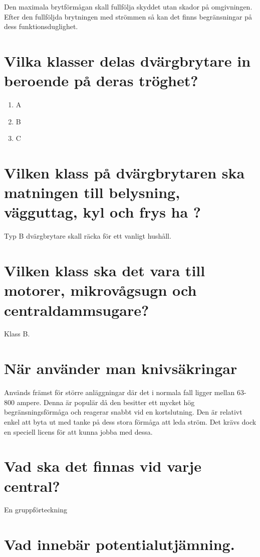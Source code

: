 \documentclass[a4paper,swedish]{article}
\begin{document}
Den maximala brytförmågan skall fullfölja skyddet utan skador på omgivningen. Efter den fullföljda brytningen med strömmen så kan det finns begränsningar på dess funktionsduglighet.

\section{Vilka klasser delas dvärgbrytare in beroende på deras tröghet?}\label{sec:RCD_classes}

\begin{enumerate}
\item A
\item B
\item C
\end{enumerate}

\section{Vilken klass på dvärgbrytaren ska matningen till belysning, vägguttag, kyl och frys ha ?}
\label{sec:q_15}

Typ B dvärgbrytare skall räcka för ett vanligt hushåll.

\section{Vilken klass ska det vara till motorer, mikrovågsugn och centraldammsugare?}\label{sec:RCD_motordrift}

Klass B.

\section{När använder man knivsäkringar}
\label{sec:q_17}

Används främst för större anläggningar där det i normala fall ligger mellan 63-800 ampere. Denna är populär då den besitter ett mycket hög begränsningsförmåga och reagerar snabbt vid en kortslutning. Den är relativt enkel att byta ut med tanke på dess stora förmåga att leda ström. Det krävs dock en speciell licens för att kunna jobba med dessa.

\section{Vad ska det finnas vid varje central?}\label{sec:vad_ska_finnas_vid_en_central}

En gruppförteckning

\section{Vad innebär potentialutjämning. }
\label{sec:q_19}
\end{document}
